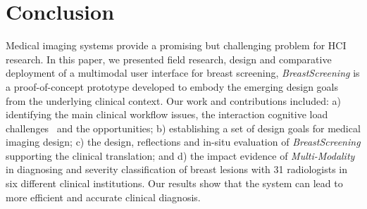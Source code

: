 \section{Conclusion}
\label{sec:sec006}

Medical imaging systems provide a promising but challenging problem for HCI research.
In this paper, we presented field research, design and comparative deployment of a multimodal user interface for breast screening,
{\it BreastScreening} is a proof-of-concept prototype developed to embody the emerging design goals from the underlying clinical context. 
Our work and contributions included:
a) identifying the main clinical workflow issues, the interaction cognitive load challenges~\cite{Castner:2018:ONG:3279810.3279845} and the opportunities;
b) establishing a set of design goals for medical imaging design;
c) the design, reflections and in-situ evaluation of {\it BreastScreening} supporting the clinical translation; and
d) the impact evidence of \textit{Multi-Modality} in diagnosing and severity classification of breast lesions with 31 radiologists in six different clinical institutions.
Our results show that the system can lead to more efficient and accurate clinical diagnosis.